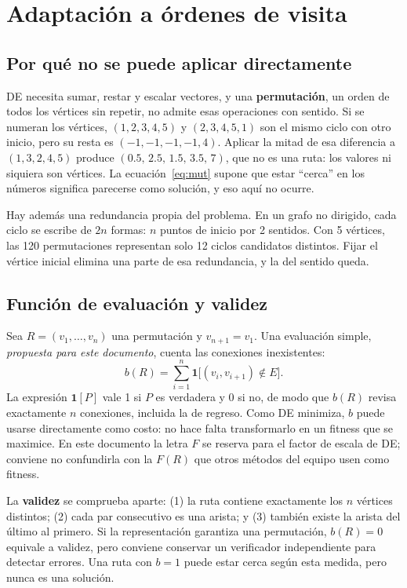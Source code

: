 \documentclass[letterpaper,12pt]{report}
\begin{document}
\section{Adaptación a órdenes de visita}
\subsection{Por qué no se puede aplicar directamente}
DE necesita sumar, restar y escalar vectores, y una \textbf{permutación}, un orden de todos los vértices sin repetir, no admite esas operaciones con sentido. Si se numeran los vértices, $(1,2,3,4,5)$ y $(2,3,4,5,1)$ son el mismo ciclo con otro inicio, pero su resta es $(-1,-1,-1,-1,4)$. Aplicar la mitad de esa diferencia a $(1,3,2,4,5)$ produce $(0.5,\,2.5,\,1.5,\,3.5,\,7)$, que no es una ruta: los valores ni siquiera son vértices. La ecuación~\eqref{eq:mut} supone que estar ``cerca'' en los números significa parecerse como solución, y eso aquí no ocurre.

Hay además una redundancia propia del problema. En un grafo no dirigido, cada ciclo se escribe de $2n$ formas: $n$ puntos de inicio por 2 sentidos. Con 5 vértices, las 120 permutaciones representan solo 12 ciclos candidatos distintos. Fijar el vértice inicial elimina una parte de esa redundancia, y la del sentido queda.

\subsection{Función de evaluación y validez}
Sea $R=(v_1,\ldots,v_n)$ una permutación y $v_{n+1}=v_1$. Una evaluación simple, \emph{propuesta para este documento}, cuenta las conexiones inexistentes:
\begin{equation}
b(R)=\sum_{i=1}^{n}\mathbf{1}\bigl[(v_i,v_{i+1})\notin E\bigr].\label{eq:b}
\end{equation}
La expresión $\mathbf{1}[P]$ vale 1 si $P$ es verdadera y 0 si no, de modo que $b(R)$ revisa exactamente $n$ conexiones, incluida la de regreso. Como DE minimiza, $b$ puede usarse directamente como costo: no hace falta transformarlo en un fitness que se maximice. En este documento la letra $F$ se reserva para el factor de escala de DE; conviene no confundirla con la $F(R)$ que otros métodos del equipo usen como fitness.

La \textbf{validez} se comprueba aparte: (1) la ruta contiene exactamente los $n$ vértices distintos; (2) cada par consecutivo es una arista; y (3) también existe la arista del último al primero. Si la representación garantiza una permutación, $b(R)=0$ equivale a validez, pero conviene conservar un verificador independiente para detectar errores. Una ruta con $b=1$ puede estar cerca según esta medida, pero nunca es una solución.
\end{document}
